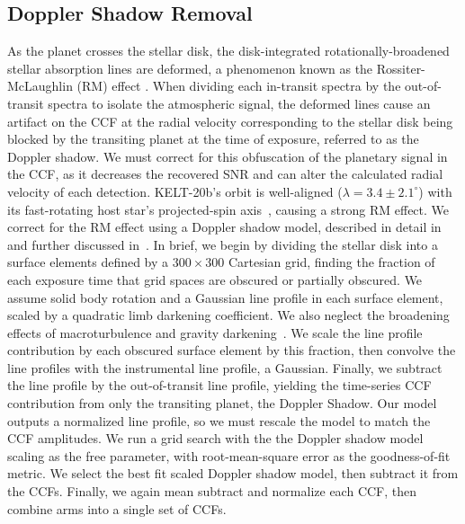 \documentclass[twocolumn]{aastex631}
\begin{document}
       \subsection{Doppler Shadow Removal}
                As the planet crosses the stellar disk, the disk-integrated rotationally-broadened stellar absorption lines are deformed, a phenomenon known as the Rossiter-McLaughlin (RM) effect \citep{Rossiter1924, McLaughlin1924}. When dividing each in-transit spectra by the out-of-transit spectra to isolate the atmospheric signal, the deformed lines cause an artifact on the CCF at the radial velocity corresponding to the stellar disk being blocked by the transiting planet at the time of exposure, referred to as the Doppler shadow. We must correct for this obfuscation of the planetary signal in the CCF, as it decreases the recovered SNR and can alter the calculated radial velocity of each detection. KELT-20b's orbit is well-aligned ($\lambda = 3.4 \pm 2.1 ^{\circ}$) with its fast-rotating host star's projected-spin axis~\citep{Lund2017}, causing a strong RM effect. We correct for the RM effect using a Doppler shadow model, described in detail in~\citet{Johnson2016} and further discussed in~\citep{Johnson2014, Johnson2017}. In brief, we begin by dividing the stellar disk into a surface elements defined by a $300 \times 300$ Cartesian grid, finding the fraction of each exposure time that grid spaces are obscured or partially obscured. We assume solid body rotation and a Gaussian line profile in each surface element, scaled by a quadratic limb darkening coefficient. We also neglect the broadening effects of macroturbulence and gravity darkening~\citet{Johnson2016}. We scale the line profile contribution by each obscured surface element by this fraction, then convolve the line profiles with the instrumental line profile, a Gaussian. Finally, we subtract the line profile by the out-of-transit line profile, yielding the time-series CCF contribution from only the transiting planet, the Doppler Shadow. Our model outputs a normalized line profile, so we must rescale the model to match the CCF amplitudes. We run a grid search with the the Doppler shadow model scaling as the free parameter, with root-mean-square error as the goodness-of-fit metric. We select the best fit scaled Doppler shadow model, then subtract it from the CCFs. Finally, we again mean subtract and normalize each CCF, then combine arms into a single set of CCFs.
                
\end{document}
